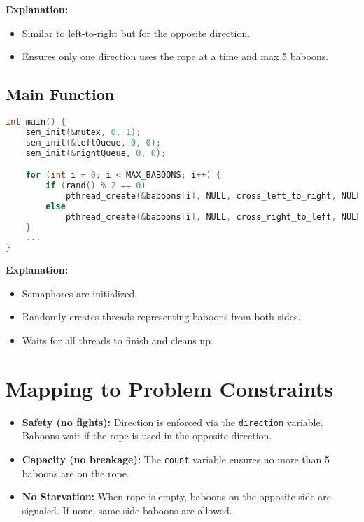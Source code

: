 \documentclass{article}
\begin{document}
\textbf{Explanation:}
\begin{itemize}
    \item Similar to left-to-right but for the opposite direction.
    \item Ensures only one direction uses the rope at a time and max 5 baboons.
\end{itemize}

\subsection*{Main Function}

\begin{lstlisting}[language=C]
int main() {
    sem_init(&mutex, 0, 1);
    sem_init(&leftQueue, 0, 0);
    sem_init(&rightQueue, 0, 0);

    for (int i = 0; i < MAX_BABOONS; i++) {
        if (rand() % 2 == 0)
            pthread_create(&baboons[i], NULL, cross_left_to_right, NULL);
        else
            pthread_create(&baboons[i], NULL, cross_right_to_left, NULL);
    }
    ...
}
\end{lstlisting}

\textbf{Explanation:}
\begin{itemize}
    \item Semaphores are initialized.
    \item Randomly creates threads representing baboons from both sides.
    \item Waits for all threads to finish and cleans up.
\end{itemize}

\section*{Mapping to Problem Constraints}

\begin{itemize}
    \item \textbf{Safety (no fights):} Direction is enforced via the \texttt{direction} variable. Baboons wait if the rope is used in the opposite direction.
    \item \textbf{Capacity (no breakage):} The \texttt{count} variable ensures no more than 5 baboons are on the rope.
    \item \textbf{No Starvation:} When rope is empty, baboons on the opposite side are signaled. If none, same-side baboons are allowed.
\end{itemize}
\end{document}
